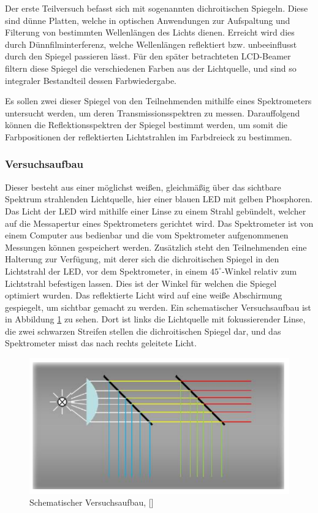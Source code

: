 
Der erste Teilversuch befasst sich mit sogenannten dichroitischen Spiegeln. Diese sind dünne Platten, welche in optischen Anwendungen zur Aufspaltung und Filterung von bestimmten Wellenlängen des Lichts dienen. Erreicht wird dies durch Dünnfilminterferenz, welche Wellenlängen reflektiert bzw. unbeeinflusst durch den Spiegel passieren lässt. Für den später betrachteten LCD-Beamer filtern diese Spiegel die verschiedenen Farben aus der Lichtquelle, und sind so integraler Bestandteil dessen Farbwiedergabe.

Es sollen zwei dieser Spiegel von den Teilnehmenden mithilfe eines Spektrometers untersucht werden, um deren Transmissionsspektren zu messen. Darauffolgend können die Reflektionsspektren der Spiegel bestimmt werden, um somit die Farbpositionen der reflektierten Lichtstrahlen im Farbdreieck zu bestimmen.

\subsubsection{Versuchsaufbau} Dieser besteht aus einer möglichst weißen, gleichmäßig über das sichtbare Spektrum strahlenden Lichtquelle, hier einer blauen LED mit gelben Phosphoren. Das Licht der LED wird mithilfe einer Linse zu einem Strahl gebündelt, welcher auf die Messapertur eines Spektrometers gerichtet wird. Das Spektrometer ist von einem Computer aus bedienbar und die vom Spektrometer aufgenommenen Messungen können gespeichert werden. Zusätzlich steht den Teilnehmenden eine Halterung zur Verfügung, mit derer sich die dichroitischen Spiegel in den Lichtstrahl der LED, vor dem Spektrometer, in einem $45^\circ$-Winkel relativ zum Lichtstrahl befestigen lassen. Dies ist der Winkel für welchen die Spiegel optimiert wurden. Das reflektierte Licht wird auf eine weiße Abschirmung gespiegelt, um sichtbar gemacht zu werden. Ein schematischer Versuchsaufbau ist in Abbildung \ref{abb:V1_AUFBAU} zu sehen. Dort ist links die Lichtquelle mit fokussierender Linse, die zwei schwarzen Streifen stellen die dichroitischen Spiegel dar, und das Spektrometer misst das nach rechts geleitete Licht.

\begin{figure}[h]
	\centering
	\includegraphics[scale=0.4]{Images/Aufbau.png}
	\caption{Schematischer Versuchsaufbau, [\cite[Abb. 3.2]{AML_SKRIPT}]}
	\label{abb:V1_AUFBAU}
\end{figure}

